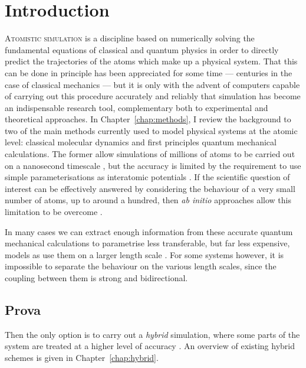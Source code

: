 \chapter{Introduction}

\lettrine{A}{tomistic simulation} is a discipline based on numerically
solving the fundamental equations of classical and quantum physics in
order to directly predict the trajectories of the atoms which make up
a physical system.
%
That this can be done in principle has been appreciated for some time
--- centuries in the case of classical mechanics --- but it is only
with the advent of computers capable of carrying out this procedure
accurately and reliably that simulation has become an indispensable
research tool, complementary both to experimental and theoretical
approaches.
%
In Chapter~\ref{chap:methods}, I review the background to two of the
main methods currently used to model physical systems at the atomic
level: classical molecular dynamics and first principles quantum
mechanical calculations.
%
The former allow simulations of millions of atoms to be carried out on
a nanosecond timescale \citep{Haile92,Rapaport04,Verlet67,Swope82},
but the accuracy is limited by the requirement to use simple
parameterisations as interatomic potentials
\citep{Lennard-Jones24,SWpotential,Tersoff_T1,
Tersoff_T2,Tersoff_T3,Brenner90,Brenner00,
Brenner02,Bazant97,Justo98,Marks00,vanDuin01,Horsfield96,Stuart00}.
%
If the scientific question of interest can be effectively answered by
considering the behaviour of a very small number of atoms, up to
around a hundred, then \emph{ab initio} approaches allow this
limitation to be overcome
\citep{Hohenberg64,Kohn65,Perdew96,Teter89,Payne92,Segal02}.
%

In many cases we can extract enough information from these accurate
quantum mechanical calculations to parametrise less transferable, but
far less expensive, models as use them on a larger length scale
\citep{Nieminen02}.
%
For some systems however, it is impossible to separate the behaviour
on the various length scales, since the coupling between them is
strong and bidirectional.
%

\section{Prova}

Then the only option is to carry out a \emph{hybrid} simulation, where
some parts of the system are treated at a higher level of accuracy
\citep{Kohlhoff91,Tadmor96,Warshel76,Maseras95}.
%
An overview of existing hybrid schemes is given in
Chapter~\ref{chap:hybrid}.

